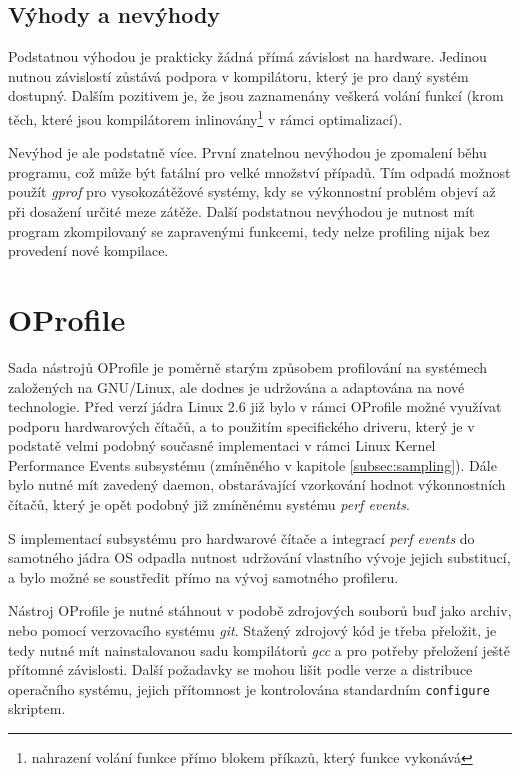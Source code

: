 \documentclass[czech,BP]{thesiskiv}
\begin{document}
\subsection*{Výhody a nevýhody}

Podstatnou výhodou je prakticky žádná přímá závislost na hardware. Jedinou nutnou závislostí zůstává podpora v kompilátoru, který je pro daný systém dostupný. Dalším pozitivem je, že jsou zaznamenány veškerá volání funkcí (krom těch, které jsou kompilátorem inlinovány\footnote{nahrazení volání funkce přímo blokem příkazů, který funkce vykonává} v rámci optimalizací).

Nevýhod je ale podstatně více. První znatelnou nevýhodou je zpomalení běhu programu, což může být fatální pro velké množství případů. Tím odpadá možnost použít \emph{gprof} pro vysokozátěžové systémy, kdy se výkonnostní problém objeví až při dosažení určité meze zátěže. Další podstatnou nevýhodou je nutnost mít program zkompilovaný se zapravenými funkcemi, tedy nelze profiling nijak  bez provedení nové kompilace.




\section{OProfile}

Sada nástrojů OProfile je poměrně starým způsobem profilování na systémech založených na GNU/Linux, ale dodnes je udržována a adaptována na nové technologie. Před verzí jádra Linux 2.6 již bylo v rámci OProfile možné využívat podporu hardwarových čítačů, a to použitím specifického driveru, který je v podstatě velmi podobný současné implementaci v rámci Linux Kernel Performance Events subsystému (zmíněného v kapitole \ref{subsec:sampling}). Dále bylo nutné mít zavedený daemon, obstarávající vzorkování hodnot výkonnostních čítačů, který je opět podobný již zmíněnému systému \emph{perf events}.

S implementací subsystému pro hardwarové čítače a integrací \emph{perf events} do samotného jádra OS odpadla nutnost udržování vlastního vývoje jejich substitucí, a bylo možné se soustředit přímo na vývoj samotného profileru.

Nástroj OProfile je nutné stáhnout v podobě zdrojových souborů buď jako archiv, nebo pomocí verzovacího systému \emph{git}. Stažený zdrojový kód je třeba přeložit, je tedy nutné mít nainstalovanou sadu kompilátorů \emph{gcc} a pro potřeby přeložení ještě přítomné závislosti. Další požadavky se mohou lišit podle verze a distribuce operačního systému, jejich přítomnost je kontrolována standardním \texttt{configure} skriptem.
\end{document}
